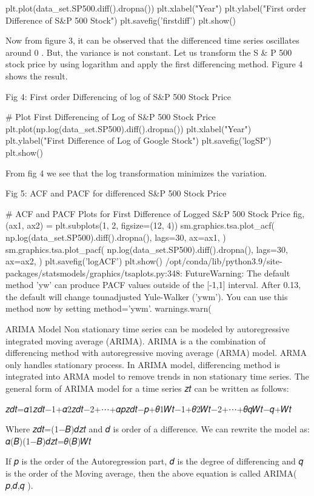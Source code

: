 plt.plot(data_set.SP500.diff().dropna())
plt.xlabel("Year")
plt.ylabel("First order Difference of S&P 500 Stock")
plt.savefig('firstdiff')
plt.show()

Now from figure 3, it can be observed that the differenced time series oscillates around  0 . But, the variance is not constant. Let us transform the S & P 500 stock price by using logarithm and apply the first differencing method. Figure 4 shows the result.

Fig 4: First order Differencing of log of S&P 500 Stock Price

# Plot First Differencing of Log of S&P 500 Stock Price
plt.plot(np.log(data_set.SP500).diff().dropna())
plt.xlabel("Year")
plt.ylabel("First Difference of Log of Google Stock")
plt.savefig('logSP')
plt.show()

From fig 4 we see that the log transformation minimizes the variation.

Fig 5: ACF and PACF for differenced S&P 500 Stock Price

# ACF and PACF Plots for First Difference of Logged S&P 500 Stock Price
fig, (ax1, ax2) = plt.subplots(1, 2, figsize=(12, 4))
sm.graphics.tsa.plot_acf(
    np.log(data_set.SP500).diff().dropna(),
    lags=30,
    ax=ax1,
)
sm.graphics.tsa.plot_pacf(
    np.log(data_set.SP500).diff().dropna(),
    lags=30,
    ax=ax2,
)
plt.savefig('logACF')
plt.show()
/opt/conda/lib/python3.9/site-packages/statsmodels/graphics/tsaplots.py:348: FutureWarning: The default method 'yw' can produce PACF values outside of the [-1,1] interval. After 0.13, the default will change tounadjusted Yule-Walker ('ywm'). You can use this method now by setting method='ywm'.
  warnings.warn(

ARIMA Model
Non stationary time series can be modeled by autoregressive integrated moving average (ARIMA). ARIMA is a the combination of differencing method with autoregressive moving average (ARMA) model. ARMA only handles stationary process. In ARIMA model, differencing method is integrated into ARMA model to remove trends in non stationary time series. The general form of ARIMA model for a time series  {𝑧𝑡}  can be written as follows:

𝑧𝑑𝑡=𝛼1𝑧𝑑𝑡−1+𝛼2𝑧𝑑𝑡−2+⋯+𝛼𝑝𝑧𝑑𝑡−𝑝+𝜃1𝑊𝑡−1+𝜃2𝑊𝑡−2+⋯+𝜃𝑞𝑊𝑡−𝑞+𝑊𝑡
 
Where  𝑧𝑑𝑡=(1−𝐵)𝑑𝑧𝑡  and  𝑑  is order of a difference.
We can rewrite the model as:
𝛼(𝐵)(1−𝐵)𝑑𝑧𝑡=𝜃(𝐵)𝑊𝑡
 
If  𝑝  is the order of the Autoregression part,  𝑑  is the degree of differencing and  𝑞  is the order of the Moving average, then the above equation is called ARIMA( 𝑝,𝑑,𝑞 ).

